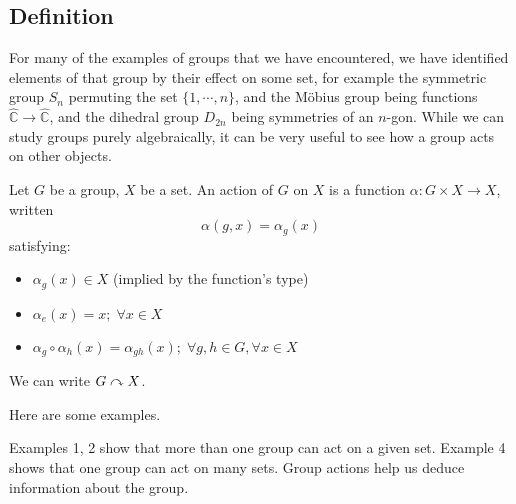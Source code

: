 \subsection{Definition}
For many of the examples of groups that we have encountered, we have identified elements of that group by their effect on some set, for example the symmetric group \(S_n\) permuting the set \(\{ 1, \cdots, n \}\), and the M\"obius group being functions \(\hat{\mathbb C} \to \hat{\mathbb C}\), and the dihedral group \(D_{2n}\) being symmetries of an \(n\)-gon.
While we can study groups purely algebraically, it can be very useful to see how a group acts on other objects.

\begin{definition}
	Let \(G\) be a group, \(X\) be a set.
	An action of \(G\) on \(X\) is a function \(\alpha: G \times X \to X\), written
	\[
		\alpha(g, x) = \alpha_g(x)
	\]
	satisfying:
	\begin{itemize}
		\item \(\alpha_g(x) \in X\) (implied by the function's type)
		\item \(\alpha_e(x) = x;\; \forall x \in X\)
		\item \(\alpha_g \circ \alpha_h(x) = \alpha_{gh}(x);\; \forall g, h \in G, \forall x \in X\)
	\end{itemize}
	We can write \(G \curvearrowright X\).
\end{definition}
Here are some examples.
Examples 1, 2 show that more than one group can act on a given set.
Example 4 shows that one group can act on many sets.
Group actions help us deduce information about the group.

